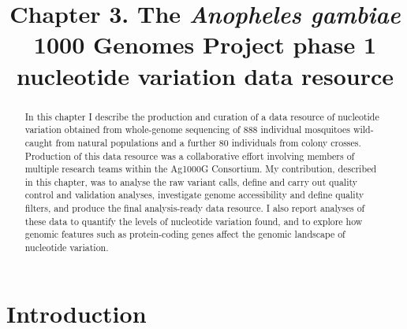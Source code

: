 \documentclass[a4paper,11pt,abstracton,hidelinks]{scrartcl}
\title{
Chapter 3. The \textit{Anopheles gambiae} 1000 Genomes Project phase 1 nucleotide variation data resource
}
\author{}
\begin{document}
\renewcommand{\abstractname}{Summary}


\maketitle



\begin{abstract}


In this chapter I describe the production and curation of a data resource of nucleotide variation obtained from whole-genome sequencing of 888 individual mosquitoes wild-caught from natural populations and a further 80 individuals from colony crosses.
%
Production of this data resource was a collaborative effort involving members of multiple research teams within the Ag1000G Consortium.
%
My contribution, described in this chapter, was to analyse the raw variant calls, define and carry out quality control and validation analyses, investigate genome accessibility and define quality filters, and produce the final analysis-ready data resource.
%
I also report analyses of these data to quantify the levels of nucleotide variation found, and to explore how genomic features such as protein-coding genes affect the genomic landscape of nucleotide variation.


\end{abstract}


\tableofcontents


\section{Introduction}
\end{document}
